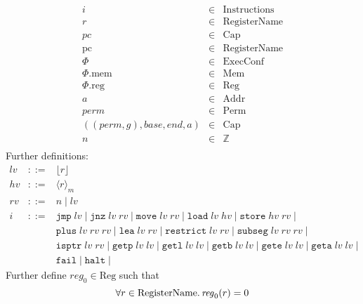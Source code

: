 \documentclass[a4paper]{article}
\newcommand{\var}[1]{\mathit{#1}}
\newcommand{\hv}{\var{hv}}
\newcommand{\rv}{\var{rv}}
\newcommand{\lv}{\var{lv}}
\newcommand{\gl}{\var{g}}
\newcommand{\pc}{\mathit{pc}}
\newcommand{\pcreg}{\mathrm{pc}}
\newcommand{\addr}{\var{a}}
\newcommand{\start}{\var{base}}
\newcommand{\addrend}{\var{end}}
\newcommand{\reg}{\var{reg}}
\newcommand{\perm}{\var{perm}}
\newcommand{\plainproj}[1]{\mathrm{#1}}
\newcommand{\memheap}[1][\Phi]{#1.\plainproj{mem}}
\newcommand{\memreg}[1][\Phi]{#1.\plainproj{reg}}
\newcommand{\plaindom}[1]{\mathrm{#1}}
\newcommand{\Caps}{\plaindom{Cap}}
\newcommand{\Addrs}{\plaindom{Addr}}
\newcommand{\ExecConfs}{\plaindom{ExecConf}}
\newcommand{\RegName}{\plaindom{RegisterName}}
\newcommand{\Regs}{\plaindom{Reg}}
\newcommand{\Heaps}{\plaindom{Mem}}
\newcommand{\Instrs}{\plaindom{Instructions}}
\newcommand{\ints}{\mathbb{Z}}
\newcommand{\Perms}{\plaindom{Perm}}
\newcommand{\refreg}[1]{\lfloor #1 \rfloor}
\newcommand{\refheap}[1]{\langle #1 \rangle_m}
\newcommand{\zinstr}[1]{\mathtt{#1}}
\newcommand{\fail}{\zinstr{fail}}
\newcommand{\halt}{\zinstr{halt}}
\newcommand{\oneinstr}[2]{\zinstr{#1} \; #2}
\newcommand{\jmp}[1]{\oneinstr{jmp}{#1}}
\newcommand{\twoinstr}[3]{\zinstr{#1} \; #2 \; #3}
\newcommand{\restricttwo}[2]{\twoinstr{restrict}{#1}{#2}}
\newcommand{\jnz}[2]{\twoinstr{jnz}{#1}{#2}}
\newcommand{\isptr}[2]{\twoinstr{isptr}{#1}{#2}}
\newcommand{\geta}[2]{\twoinstr{geta}{#1}{#2}}
\newcommand{\getb}[2]{\twoinstr{getb}{#1}{#2}}
\newcommand{\gete}[2]{\twoinstr{gete}{#1}{#2}}
\newcommand{\getp}[2]{\twoinstr{getp}{#1}{#2}}
\newcommand{\getl}[2]{\twoinstr{getl}{#1}{#2}}
\newcommand{\move}[2]{\twoinstr{move}{#1}{#2}}
\newcommand{\store}[2]{\twoinstr{store}{#1}{#2}}
\newcommand{\load}[2]{\twoinstr{load}{#1}{#2}}
\newcommand{\lea}[2]{\twoinstr{lea}{#1}{#2}}
\newcommand{\threeinstr}[4]{\zinstr{#1} \; #2 \; #3 \; #4}
\newcommand{\subseg}[3]{\threeinstr{subseg}{#1}{#2}{#3}}
\newcommand{\plus}[3]{\threeinstr{plus}{#1}{#2}{#3}}
\begin{document}
\[
\begin{array}{rcl}
i       &\in& \Instrs \\
r       &\in& \RegName\\
\pc     &\in& \Caps \\
\pcreg  &\in& \RegName \\
\Phi    &\in& \ExecConfs \\
\memheap&\in& \Heaps \\
\memreg &\in& \Regs \\
\addr   &\in& \Addrs\\
\perm   &\in& \Perms\\
((\perm,\gl),\start,\addrend,\addr) &\in& \Caps \\
n       &\in& \ints\\
\end{array}
\]
Further definitions:
\[
\begin{array}{rcl}
\lv    &::=& \refreg{r} \\
\hv    &::=& \refheap{r}\\
\rv    &::=& n \mid \lv \\
i      &::=& 
             \jmp{\lv} \mid 
             \jnz{\lv}{\rv} \mid
             \move{\lv}{\rv} \mid 
             \load{\lv}{\hv} \mid 
             \store{\hv}{\rv} \mid  \\
       &   & \plus{\lv}{\rv}{\rv} \mid 
             \lea{\lv}{\rv} \mid 
             \restricttwo{\lv}{\rv} \mid 
             \subseg{\lv}{\rv}{\rv} \mid  \\
       &   & \isptr{\lv}{\rv} \mid 
             \getp{\lv}{\lv} \mid 
             \getl{\lv}{\lv} \mid 
             \getb{\lv}{\lv} \mid
             \gete{\lv}{\lv} \mid
             \geta{\lv}{\lv} \mid \\
       &   & \fail \mid
             \halt \mid 
\end{array}
\]
Further define $\reg_0 \in \Regs$ such that
\[
  \forall r \in \RegName \ldotp \reg_0(r) = 0
\]
\end{document}
